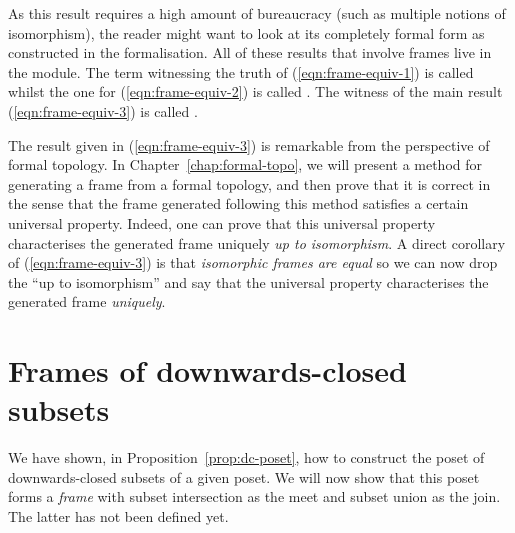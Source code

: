 As this result requires a high amount of bureaucracy (such as multiple notions of
isomorphism), the reader might want to look at its completely formal form as constructed
in the \veragda{} formalisation. All of these results that involve frames live in the
 module. The term witnessing the truth of (\ref{eqn:frame-equiv-1}) is
called  whilst the one for (\ref{eqn:frame-equiv-2}) is called
. The witness of the main result (\ref{eqn:frame-equiv-3}) is called
.

The result given in (\ref{eqn:frame-equiv-3}) is remarkable from the perspective of formal
topology. In Chapter~\ref{chap:formal-topo}, we will present a method for generating a
frame from a formal topology, and then prove that it is correct in the sense that the
frame generated following this method satisfies a certain universal property. Indeed, one
can prove that this universal property characterises the generated frame uniquely
\emph{up to isomorphism}. A direct corollary of (\ref{eqn:frame-equiv-3}) is that
\emph{isomorphic frames are equal} so we can now drop the ``up to isomorphism'' and say
that the universal property characterises the generated frame \emph{uniquely}.

\section{Frames of downwards-closed subsets}\label{sec:down-set-frame}

We have shown, in Proposition~\ref{prop:dc-poset}, how to construct the poset of
downwards-closed subsets of a given poset. We will now show that this poset forms a
\emph{frame} with subset intersection as the meet and subset union as the join. The latter
has not been defined yet.

